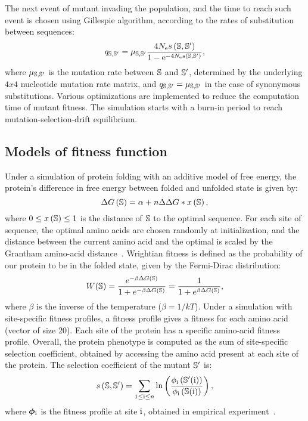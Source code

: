The next event of mutant invading the population, and the time to reach such event is chosen using Gillespie algorithm, according to the rates of substitution between sequences:
\begin{equation}
    q_{\mathbb{S}, \mathbb{S}'} = \mu_{\mathbb{S}, \mathbb{S}'} \dfrac{4 N_{\mathrm{e}} s \left( \mathbb{S},\mathbb{S}'\right)}{1 - \mathrm{e}^{-4 N_{\mathrm{e}} s \left( \mathbb{S},\mathbb{S}'\right)}},
\end{equation}
where $\mu_{\mathbb{S}, \mathbb{S}'}$ is the mutation rate between $\mathbb{S}$ and $\mathbb{S}'$, determined by the underlying $4x4$ nucleotide mutation rate matrix, and ${q_{\mathbb{S}, \mathbb{S}'}} = \mu_{\mathbb{S}, \mathbb{S}'}$ in the case of synonymous substitutions.
Various optimizations are implemented to reduce the computation time of mutant fitness.
The simulation starts with a burn-in period to reach mutation-selection-drift equilibrium.

\subsection{Models of fitness function}
\label{MatMet:folding}

Under a simulation of protein folding with an additive model of free energy, the protein's difference in free energy between folded and unfolded state is given by:
\begin{equation*}
    \Delta G\left(\mathbb{S}\right) = \alpha + n \Delta \Delta G * x\left(\mathbb{S}\right),
\end{equation*}
where $0 \leq x\left(\mathbb{S}\right) \leq 1$ is the distance of $\mathbb{S}$ to the optimal sequence.
For each site of sequence, the optimal amino acids are chosen randomly at initialization, and the distance between the current amino acid and the optimal is scaled by the Grantham amino-acid distance~\citep{Grantham1974}.
Wrightian fitness is defined as the probability of our protein to be in the folded state, given by the Fermi-Dirac distribution:
\begin{equation}
    W (\mathbb{S}) = \dfrac{e^{-\beta \Delta G\left(\mathbb{S}\right) }}{1 + e^{-\beta \Delta G\left(\mathbb{S}\right) }} = \dfrac{1}{1 + e^{\beta \Delta G\left(\mathbb{S}\right) }},
\end{equation}
where $\beta$ is the inverse of the temperature ($\beta=1/kT$).
Under a simulation with site-specific fitness profiles, a fitness profile gives a fitness for each amino acid (vector of size $20$).
Each site of the protein has a specific amino-acid fitness profile.
Overall, the protein phenotype is computed as the sum of site-specific selection coefficient, obtained by accessing the amino acid present at each site of the protein.
The selection coefficient of the mutant $\mathbb{S}'$ is:
\begin{equation}
    s \left( \mathbb{S},\mathbb{S}'\right) = \sum\limits_{1 \leq \text{i} \leq n} \ln \left( \dfrac{\phi_{\text{i}} \left(\mathbb{S}'(\text{i}) \right)}{\phi_{\text{i}} \left(\mathbb{S}(\text{i}) \right)} \right) ,
\end{equation}
where $\bm{\phi}_{\text{i}}$ is the fitness profile at site $\text{i}$, obtained in empirical experiment~\citep{Bloom2017}.

